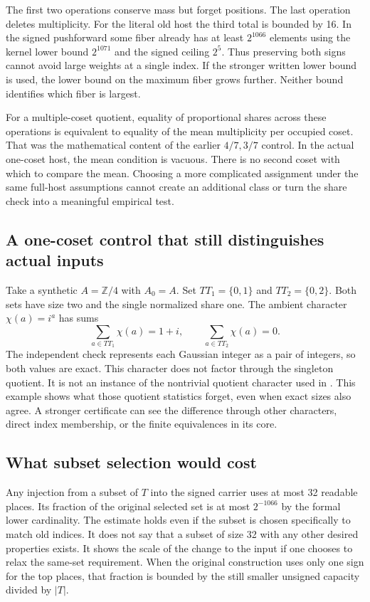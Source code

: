 \documentclass[12pt,letterpaper]{article}
\newcommand{\id}[1]{\ifmmode\text{\small\nolinkurl{#1}}\else{\small\nolinkurl{#1}}\fi}
\begin{document}
The first two operations conserve mass but forget positions. The last operation deletes multiplicity. For the literal old host the third total is bounded by 16. In the signed pushforward some fiber already has at least $2^{1066}$ elements using the kernel lower bound $2^{1071}$ and the signed ceiling $2^5$. Thus preserving both signs cannot avoid large weights at a single index. If the stronger written lower bound is used, the lower bound on the maximum fiber grows further. Neither bound identifies which fiber is largest.

For a multiple-coset quotient, equality of proportional shares across these operations is equivalent to equality of the mean multiplicity per occupied coset. That was the mathematical content of the earlier $4/7,3/7$ control. In the actual one-coset host, the mean condition is vacuous. There is no second coset with which to compare the mean. Choosing a more complicated assignment under the same full-host assumptions cannot create an additional class or turn the share check into a meaningful empirical test.

\subsection{A one-coset control that still distinguishes actual inputs}
Take a synthetic $A=\mathbb Z/4$ with $A_0=A$. Set $TT_1=\{0,1\}$ and $TT_2=\{0,2\}$. Both sets have size two and the single normalized share one. The ambient character $\chi(a)=i^a$ has sums
\[
                             \sum_{a\in TT_1}\chi(a)=1+i,\qquad
                             \sum_{a\in TT_2}\chi(a)=0 .
\]
The independent check represents each Gaussian integer as a pair of integers, so both values are exact. This character does not factor through the singleton quotient. It is not an instance of the nontrivial quotient character used in \id{tops_sum}. This example shows what those quotient statistics forget, even when exact sizes also agree. A stronger certificate can see the difference through other characters, direct index membership, or the finite equivalences in its core.

\subsection{What subset selection would cost}
Any injection from a subset of $T$ into the signed carrier uses at most 32 readable places. Its fraction of the original selected set is at most $2^{-1066}$ by the formal lower cardinality. The estimate holds even if the subset is chosen specifically to match old indices. It does not say that a subset of size 32 with any other desired properties exists. It shows the scale of the change to the input if one chooses to relax the same-set requirement. When the original construction uses only one sign for the top places, that fraction is bounded by the still smaller unsigned capacity divided by $|T|$.
\end{document}
